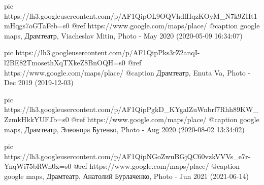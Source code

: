      pic https://lh3.googleusercontent.com/p/AF1QipOL9OQVhdlHqzKOyM_N7k9ZHt1mHqgs7oGTaFeb=s0
     @ref https://www.google.com/maps/place/%
     @caption google maps, Драмтеатр, Viacheslav Mitin, Photo - May 2020 (2020-05-09 16:34:07)

     pic https://lh3.googleusercontent.com/p/AF1QipPks3rZ2anqI-l2BE82TmosethXqTXkeZ8BnOQH=s0
     @ref https://www.google.com/maps/place/%
     @caption Драмтеатр, Enuta Va, Photo - Dec 2019 (2019-12-03)

     pic https://lh3.googleusercontent.com/p/AF1QipPgkD_KYgalZuWnbrf7Rhh89KW_ZzmkHkkYUFJb=s0
     @ref https://www.google.com/maps/place/%
     @caption google maps, Драмтеатр, Элеонора Бутенко, Photo - Aug 2020 (2020-08-02 13:34:02)

     pic https://lh3.googleusercontent.com/p/AF1QipNGoZwuBGjQC60vzkVVVs_e7r-YnqWi75bRWn0x=s0
     @ref https://www.google.com/maps/place/%
     @caption google maps, Драмтеатр, Анатолий Бурлаченко, Photo - Jun 2021 (2021-06-14)


